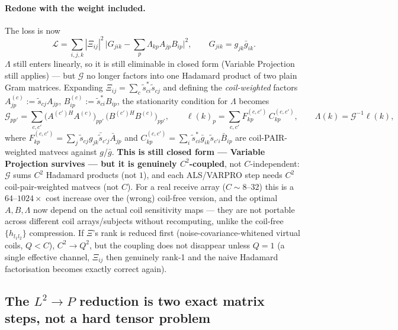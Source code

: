 \documentclass{article}
\begin{document}
\paragraph{Redone with the weight included.} The loss is now
\begin{equation}
    \mathcal{L} = \sum_{i,j,k} |\Xi_{ij}|^2\,\bigl|G_{jik}-\textstyle\sum_p\Lambda_{kp}A_{jp}B_{ip}\bigr|^2,
    \qquad G_{jik}=g_{jk}\bar g_{ik}.
    \label{eq:coil_weighted_loss}
\end{equation}
$\Lambda$ still enters linearly, so it is still eliminable in closed form (Variable Projection
still applies) — but $\mathcal{G}$ no longer factors into one Hadamard product of two plain Gram
matrices. Expanding $\Xi_{ij}=\sum_c\tilde s^*_{ci}\tilde s_{cj}$ and defining the
\emph{coil-weighted} factors $A^{(c)}_{jp}:=\tilde s_{cj}A_{jp}$, $B^{(c)}_{ip}:=\tilde
s^*_{ci}B_{ip}$, the stationarity condition for $\Lambda$ becomes
\begin{equation}
    \mathcal{G}_{pp'} = \sum_{c,c'} \bigl(A^{(c')H}A^{(c)}\bigr)_{pp'}\,\bigl(B^{(c')H}B^{(c)}\bigr)_{pp'},
    \qquad
    \boldsymbol\ell(k)_p = \sum_{c,c'} F^{(c,c')}_{kp}\,C^{(c,c')}_{kp},
    \qquad
    \Lambda(k)=\mathcal{G}^{-1}\boldsymbol\ell(k),
    \label{eq:coil_weighted_lambda}
\end{equation}
where $F^{(c,c')}_{kp}=\sum_j \tilde s_{cj}g_{jk}\bar{\tilde s}_{c'j}\bar A_{jp}$ and
$C^{(c,c')}_{kp}=\sum_i \tilde s^*_{ci}\bar g_{ik}\tilde s_{c'i}\bar B_{ip}$ are coil-PAIR-weighted
matvecs against $g$/$\bar g$. \textbf{This is still closed form — Variable Projection survives —
but it is genuinely $C^2$-coupled}, not $C$-independent: $\mathcal{G}$ sums $C^2$ Hadamard
products (not $1$), and each ALS/VARPRO step needs $C^2$ coil-pair-weighted matvecs (not $C$).
For a real receive array ($C\sim8$--$32$) this is a $64$--$1024\times$ cost increase over the
(wrong) coil-free version, and the optimal $A,B,\Lambda$ now depend on the actual coil
sensitivity maps — they are not portable across different coil arrays/subjects without
recomputing, unlike the coil-free $\{h_{l_1l_2}\}$ compression. If $\Xi$'s rank is reduced first
(noise-covariance-whitened virtual coils, $Q<C$), $C^2\to Q^2$, but the coupling does not
disappear unless $Q=1$ (a single effective channel, $\Xi_{ij}$ then genuinely rank-1 and the
naive Hadamard factorisation becomes exactly correct again).

\subsection{The $L^2\to P$ reduction is two exact matrix steps, not a hard tensor problem}
\end{document}
